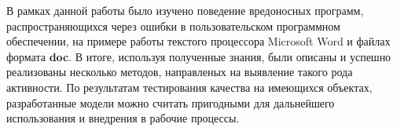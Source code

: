 
В рамках данной работы было изучено поведение вредоносных программ, распространяющихся через ошибки в пользовательском программном обеспечении, на примере работы текстого процессора Microsoft Word и файлах формата \textbf{doc}.
В итоге, используя полученные знания, были описаны и успешно реализованы несколько методов, направленых на выявление такого рода активности.
По результатам тестирования качества на имеющихся объектах, разработанные модели можно считать пригодными для дальнейшего использования и внедрения в рабочие процессы.